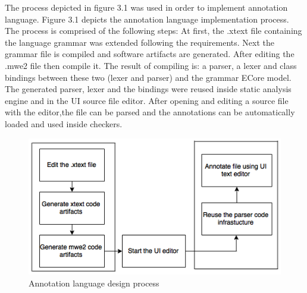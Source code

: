 The process depicted in figure 3.1 was used in order to
implement annotation language. Figure 3.1 depicts the
annotation language implementation process. The process is
comprised of the following steps: At first, the .xtext file
containing the language grammar was extended following the requirements. Next the grammar file is compiled and software
artifacts are generated. After editing the .mwe2 file then compile it. The result of compiling is: a parser, a lexer and class bindings between these two (lexer and parser) and the grammar ECore model. The generated parser, lexer and the bindings were reused inside static analysis engine and in the UI source file editor. After opening and editing a source file with the editor,the file can be parsed and the annotations can be automatically loaded and used inside checkers.
\begin{figure}[htbp]
	\centering
	\includegraphics{styles/Language_Design_Process.png}
	\caption{Annotation language design process}
\end{figure}